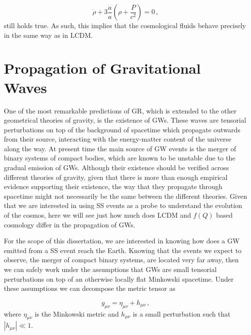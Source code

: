 \begin{equation}
    \label{eq:STG-continuity}
    \dot{\rho} + 3 \frac{\dot{a}}{a} \left(\rho + \frac{P}{c^2} \right) = 0 \,,
\end{equation}
still holds true. As such, this implies that the cosmological fluids behave precisely in the same way as in \gls{LCDM}.


\section{Propagation of Gravitational Waves}

One of the most remarkable predictions of \gls{GR}, which is extended to the other geometrical theories of gravity, is the existence of \glspl{GW}. These waves are tensorial perturbations on top of the background of spacetime which propagate outwards from their source, interacting with the energy-matter content of the universe along the way. At present time the main source of \gls{GW} events is the merger of binary systems of compact bodies, which are known to be unstable due to the gradual emission of \glspl{GW}. Although their existence should be verified across different theories of gravity, given that there is more than enough empirical evidence supporting their existence, the way that they propagate through spacetime might not necessarily be the same between the different theories. Given that we are interested in using \gls{SS} events as a probe to understand the evolution of the cosmos, here we will see just how much does \gls{LCDM} and $f(Q)$ based cosmology differ in the propagation of \glspl{GW}.

For the scope of this dissertation, we are interested in knowing how does a \gls{GW} emitted from a \gls{SS} event reach the Earth. Knowing that the events we expect to observe, the merger of compact binary systems, are located very far away, then we can safely work under the assumptions that \glspl{GW} are small tensorial perturbations on top of an otherwise locally flat Minkowski spacetime. Under these assumptions we can decompose the metric tensor as \cite{Maggiore2007}

\begin{equation}
    g_{\mu \nu} = \eta_{\mu \nu} + h_{\mu \nu} \,,
\end{equation}
where $\eta_{\mu \nu}$ is the Minkowski metric and $h_{\mu \nu}$ is a small perturbation such that $| h_{\mu \nu}| \ll 1$.

